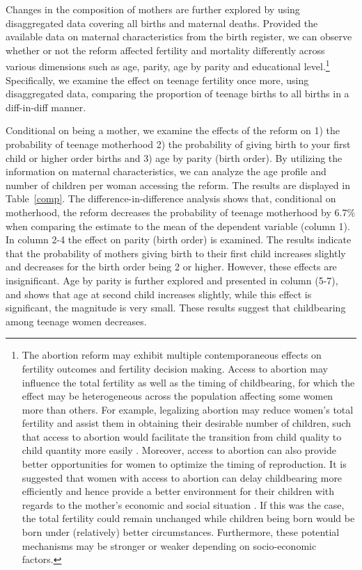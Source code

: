 \documentclass[a4paper, 11pt]{article}
\begin{document}
\begin{spacing}{2}
Changes in the composition of mothers are further explored by using disaggregated data covering all births and maternal deaths. Provided the available data on maternal characteristics from the birth register, we can observe whether or not the reform affected fertility and mortality differently across various dimensions such as age, parity, age by parity and educational level.\footnote{The abortion reform may exhibit multiple contemporaneous effects on fertility outcomes and fertility decision making. Access to abortion may influence the total fertility as well as the timing of childbearing, for which the effect may be heterogeneous across the population affecting some women more than others. For example, legalizing abortion may reduce women’s total fertility and assist them in obtaining their desirable number of children, such that access to abortion would facilitate the transition from child quality to child quantity more easily \citep{becker1974interaction}. Moreover, access to abortion can also provide better opportunities for women to optimize the timing of reproduction. It is suggested that women with access to abortion can delay childbearing more efficiently and hence provide a better environment for their children with regards to the mother’s economic and social situation \citep{DonohueLevitt2001}. If this was the case, the total fertility could remain unchanged while children being born would be born under (relatively) better circumstances. Furthermore, these potential mechanisms may be stronger or weaker depending on socio-economic factors.} Specifically, we examine the effect on teenage fertility once more, using disaggregated data, comparing the proportion of teenage births to all births in a diff-in-diff manner.   
 

 Conditional on being a mother, we examine the effects of the reform on 1) the probability of teenage motherhood 2) the probability of giving birth to your first child or higher order births and 3) age by parity (birth order). By utilizing the information on maternal characteristics, we can analyze the age profile and number of children per woman accessing the reform. The results are displayed in Table~\ref{comp}. The difference-in-difference analysis shows that, conditional on motherhood, the reform decreases the probability of teenage motherhood by 6.7\% when comparing the estimate to the mean of the dependent variable (column 1). In column 2-4 the effect on parity (birth order) is examined. The results indicate that the probability of mothers giving birth to their first child increases slightly and decreases for the birth order being 2 or higher. However, these effects are insignificant. Age by parity is further explored and presented in column (5-7), and shows that age at second child increases slightly, while this effect is significant, the magnitude is very small. These results suggest that childbearing among teenage women decreases.  


\end{spacing}
\end{document}
